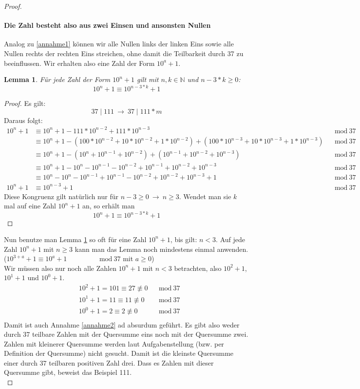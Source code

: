 \documentclass{article}
\newtheorem{lemma}{Lemma}
\begin{document}
\begin{proof}
	\paragraph{Die Zahl besteht also aus zwei Einsen und ansonsten Nullen}
	Analog zu \ref{annahme1} können wir alle Nullen links der linken Eins sowie alle Nullen rechts der rechten Eins streichen, ohne damit die Teilbarkeit durch 37 zu beeinflussen. Wir erhalten also eine Zahl der Form $10^a+1$.
	\begin{lemma}
		\label{lemma1}
		Für jede Zahl der Form $10^n+1$ gilt mit $n,k\in \mathbb{N}$ und $n-3*k \ge 0$:
		\[10^n+1\equiv 10^{n-3*k}+1\]
	\end{lemma}
	\begin{proof}
		Es gilt:
			\[37\mid 111\ \to\ 37\mid 111*m \]
		Daraus folgt:
		\begin{align*}
			10^n+1&\equiv 10^n+1-111*10^{n-2}+111*10^{n-3}&&\mathrm{mod}\ 37\\
			&\equiv 10^n+1-\left(100*10^{n-2}+10*10^{n-2}+1*10^{n-2}\right) + \left(100*10^{n-3}+10*10^{n-3}+1*10^{n-3}\right)&&\mathrm{mod}\ 37\\
			&\equiv 10^n+1-\left(10^{n}+10^{n-1}+10^{n-2}\right) + \left(10^{n-1}+10^{n-2}+10^{n-3}\right)&&\mathrm{mod}\ 37\\
			&\equiv 10^n+1-10^{n}-10^{n-1}-10^{n-2}+10^{n-1}+10^{n-2}+10^{n-3}&&\mathrm{mod}\ 37\\	
			&\equiv 10^n-10^n-10^{n-1}+10^{n-1}-10^{n-2}+10^{n-2}+10^{n-3}+1&&\mathrm{mod}\ 37\\
			10^n+1&\equiv 10^{n-3}+1&&\mathrm{mod}\ 37		
		\end{align*}
		Diese Kongruenz gilt natürlich nur für $n-3\ge 0\ \to\  n\ge 3$.
		Wendet man sie $k$ mal auf eine Zahl $10^n+1$ an, so erhält man \[10^n+1\equiv 10^{n-3*k}+1\]
	\end{proof}
	
	Nun benutze man Lemma \ref{lemma1} so oft für eine Zahl $10^n+1$, bis gilt: $n<3$.
	Auf jede Zahl $10^n+1$ mit $n\ge 3$ kann man das Lemma noch mindestens einmal anwenden.
	($10^{3+a}+1\equiv 10^{a}+1\hspace{2cm}\mathrm{mod}\ 37$ mit $a\ge 0$)\\
	Wir müssen also nur noch alle Zahlen $10^n+1$ mit $n<3$ betrachten, also $10^2+1$, $10^1+1$ und $10^0+1$.
	\begin{align*}
		&10^2+1=101\equiv 27 \not\equiv 0&&\mathrm{mod}\ 37\\
		&10^1+1=11\equiv 11 \not\equiv 0&&\mathrm{mod}\ 37\\
		&10^0+1=2\equiv 2 \not\equiv 0&&\mathrm{mod}\ 37\\
	\end{align*}
	Damit ist auch Annahme \ref{annahme2} ad absurdum geführt.
	Es gibt also weder durch 37 teilbare Zahlen mit der Quersumme eins noch mit der Quersumme zwei. Zahlen mit kleinerer Quersumme werden laut Aufgabenstellung (bzw. per Definition der Quersumme) nicht gesucht.
	Damit ist die kleinste Quersumme einer durch 37 teilbaren positiven Zahl drei. Dass es Zahlen mit dieser Quersumme gibt, beweist das Beispiel 111.\\
\end{proof}
\end{document}
